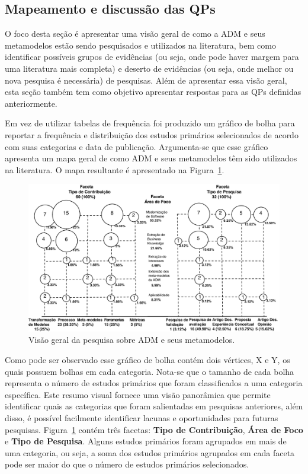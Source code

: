 \subsection{Mapeamento e discussão das QPs}\label{subsec:mapeamento_e_dis}

O foco desta seção é apresentar uma visão geral de como a ADM e seus metamodelos estão sendo pesquisados e utilizados na literatura, bem como identificar possíveis grupos de evidências (ou seja, onde pode haver margem para uma literatura mais completa) e deserto de evidências (ou seja, onde melhor ou nova pesquisa é necessária) de pesquisas. Além de apresentar essa visão geral, esta seção também tem como objetivo apresentar respostas para as QPs definidas anteriormente.

Em vez de utilizar tabelas de frequência foi produzido um gráfico de bolha para reportar a frequência e distribuição dos estudos primários selecionados de acordo com suas categorias e data de publicação. Argumenta-se que esse gráfico apresenta um mapa geral de como ADM e seus metamodelos têm sido utilizados na literatura. O mapa resultante é apresentado na Figura~\ref{fig:mapa_mapeamento_sistematico}.


\begin{figure}[h]
 \caption{Visão geral da pesquisa sobre ADM e seus metamodelos.}
 \label{fig:mapa_mapeamento_sistematico}
 \centering
 \includegraphics[scale=0.8]{images/MapaMS_port}
 \fautor
\end{figure}

Como pode ser observado esse gráfico de bolha contém dois vértices, X e Y, os quais possuem bolhas em cada categoria. Nota-se que o tamanho de cada bolha representa o número de estudos primários que foram classificados a uma categoria específica. Este resumo visual fornece uma visão panorâmica que permite identificar quais as categorias que foram salientadas em pesquisas anteriores, além disso, é possível facilmente identificar lacunas e oportunidades para futuras pesquisas. Figura~\ref{fig:mapa_mapeamento_sistematico} contém três facetas: \textbf{Tipo de Contribuição}, \textbf{Área de Foco} e \textbf{Tipo de Pesquisa}. Alguns estudos primários foram agrupados em mais de uma categoria, ou seja, a soma dos estudos primários agrupados em cada faceta pode ser maior do que o número de estudos primários selecionados.

